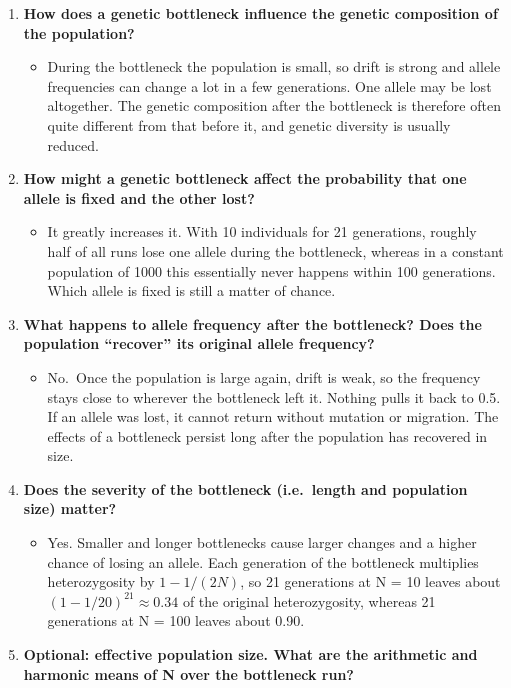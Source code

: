 \documentclass[
  a4paper]{book}
\providecommand{\tightlist}{%
  \setlength{\itemsep}{0pt}\setlength{\parskip}{0pt}}
\begin{document}
\begin{enumerate}
\def\labelenumi{\arabic{enumi}.}
\tightlist
\item
  \textbf{How does a genetic bottleneck influence the genetic composition of the population?}

  \begin{itemize}
  \tightlist
  \item
    During the bottleneck the population is small, so drift is strong and allele frequencies can change a lot in a few generations. One allele may be lost altogether. The genetic composition after the bottleneck is therefore often quite different from that before it, and genetic diversity is usually reduced.
  \end{itemize}
\item
  \textbf{How might a genetic bottleneck affect the probability that one allele is fixed and the other lost?}

  \begin{itemize}
  \tightlist
  \item
    It greatly increases it. With 10 individuals for 21 generations, roughly half of all runs lose one allele during the bottleneck, whereas in a constant population of 1000 this essentially never happens within 100 generations. Which allele is fixed is still a matter of chance.
  \end{itemize}
\item
  \textbf{What happens to allele frequency after the bottleneck? Does the population ``recover'' its original allele frequency?}

  \begin{itemize}
  \tightlist
  \item
    No.~Once the population is large again, drift is weak, so the frequency stays close to wherever the bottleneck left it. Nothing pulls it back to 0.5. If an allele was lost, it cannot return without mutation or migration. The effects of a bottleneck persist long after the population has recovered in size.
  \end{itemize}
\item
  \textbf{Does the severity of the bottleneck (i.e.~length and population size) matter?}

  \begin{itemize}
  \tightlist
  \item
    Yes. Smaller and longer bottlenecks cause larger changes and a higher chance of losing an allele. Each generation of the bottleneck multiplies heterozygosity by \(1 - 1/(2N)\), so 21 generations at N = 10 leaves about \((1 - 1/20)^{21} \approx 0.34\) of the original heterozygosity, whereas 21 generations at N = 100 leaves about 0.90.
  \end{itemize}
\item
  \textbf{Optional: effective population size. What are the arithmetic and harmonic means of N over the bottleneck run?}


\end{enumerate}
\end{document}
